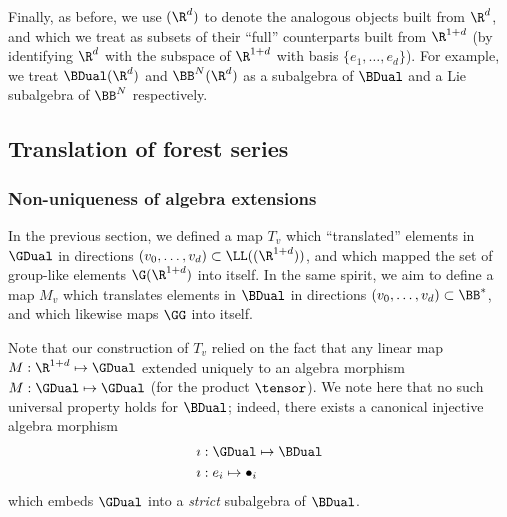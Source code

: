 \documentclass{article}
\begin{document}
Finally, as before, we use $(\R^{d})$ to denote the analogous objects built from $\R^d$, and which we treat as subsets of their ``full'' counterparts built from $\R^{1+d}$ (by identifying $\R^d$ with the subspace of $\R^{1+d}$ with basis $\{e_1,\ldots, e_d\}$). For example, we treat $\BDual(\R^d)$ and $\BB^N(\R^d)$ as a subalgebra of $\BDual$ and a Lie subalgebra of $\BB^N$ respectively.


%
%
%
%

\subsection{Translation of forest series} 
\label{subsec:transBranched}

\subsubsection{Non-uniqueness of algebra extensions}

In the previous section, we defined a map $T_v$ which ``translated'' elements in $\GDual$ in directions $(v_0,\ldots,v_d) \subset \LL((\R^{1+d}))$, and which mapped the set of group-like elements $\G(\R^{1+d})$ into itself. In the same spirit, we aim to define a map $M_v$ which translates elements in $\BDual$ in directions $(v_0,\ldots,v_d) \subset \BB^*$, and which likewise maps $\GG$ into itself.

Note that our construction of $T_v$ relied on the fact that any linear map $M : \R^{1+d} \mapsto \GDual$ extended uniquely to an algebra morphism $M : \GDual \mapsto \GDual$ (for the product $\tensor$). We note here that no such universal property holds for $\BDual$; indeed, there exists a canonical injective algebra morphism
\begin{align}
\begin{split}\label{eq:tensorForestEmbed}
\imath &: \GDual \mapsto \BDual \\
\imath &: e_i \mapsto \bullet_i
\end{split}
\end{align}
which embeds $\GDual$ into a \emph{strict} subalgebra of $\BDual$. 
\end{document}
